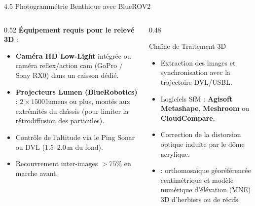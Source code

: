 \begin{frame}{4.5 Photogrammétrie Benthique avec BlueROV2}
  \begin{columns}[T]
    \begin{column}{0.52\textwidth}
      \textbf{Équipement requis pour le relevé 3D} :
      \begin{itemize}
        \item \textbf{Caméra HD Low-Light} intégrée ou caméra reflex/action cam (GoPro / Sony RX0) dans un caisson dédié.
        \item \textbf{Projecteurs Lumen (BlueRobotics)} : $2 \times 1500\,\text{lumens}$ ou plus, montés aux extrémités du châssis (pour limiter la rétrodiffusion des particules).
        \item Contrôle de l'altitude via le Ping Sonar ou DVL ($1.5\text{--}2.0\,\text{m}$ du fond).
        \item Recouvrement inter-images $>75\%$ en marche avant.
      \end{itemize}
    \end{column}

    \begin{column}{0.48\textwidth}
      \begin{block}{Chaîne de Traitement 3D}
        \begin{itemize}
          \item Extraction des images et synchronisation avec la trajectoire DVL/USBL.
          \item Logiciels SfM : \textbf{Agisoft Metashape}, \textbf{Meshroom} ou \textbf{CloudCompare}.
          \item Correction de la distorsion optique induite par le dôme acrylique.
          \item {} : orthomosaïque géoréférencée centimétrique et modèle numérique d'élévation (MNE) 3D d'herbiers ou de récifs.
        \end{itemize}
      \end{block}
    \end{column}
  \end{columns}
\end{frame}

